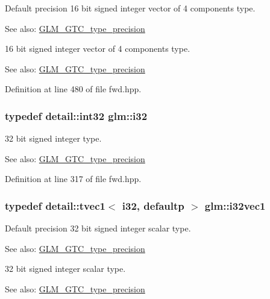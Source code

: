 Default precision 16 bit signed integer vector of 4 components type. \begin{Desc}
\item[See also:]\hyperlink{group__gtc__type__precision}{GLM\_\-GTC\_\-type\_\-precision}\end{Desc}
16 bit signed integer vector of 4 components type. \begin{Desc}
\item[See also:]\hyperlink{group__gtc__type__precision}{GLM\_\-GTC\_\-type\_\-precision} \end{Desc}


Definition at line 480 of file fwd.hpp.\hypertarget{group__gtc__type__precision_g1d8ed5c43e91ea7d4528389da4fa9524}{
\subsubsection[i32]{\setlength{\rightskip}{0pt plus 5cm}typedef detail::int32 {\bf glm::i32}}}
\label{group__gtc__type__precision_g1d8ed5c43e91ea7d4528389da4fa9524}


32 bit signed integer type. \begin{Desc}
\item[See also:]\hyperlink{group__gtc__type__precision}{GLM\_\-GTC\_\-type\_\-precision} \end{Desc}


Definition at line 317 of file fwd.hpp.\hypertarget{group__gtc__type__precision_g0d3741d44591183f3dee9500b4ad9ab4}{
\subsubsection[i32vec1]{\setlength{\rightskip}{0pt plus 5cm}typedef detail::tvec1$<$ i32, defaultp $>$ {\bf glm::i32vec1}}}
\label{group__gtc__type__precision_g0d3741d44591183f3dee9500b4ad9ab4}


Default precision 32 bit signed integer scalar type. \begin{Desc}
\item[See also:]\hyperlink{group__gtc__type__precision}{GLM\_\-GTC\_\-type\_\-precision}\end{Desc}
32 bit signed integer scalar type. \begin{Desc}
\item[See also:]\hyperlink{group__gtc__type__precision}{GLM\_\-GTC\_\-type\_\-precision} \end{Desc}


